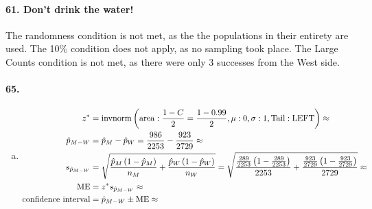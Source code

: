 		\paragraph{61. Don't drink the water!}
			The randomness condition is not met, as the the populations in their entirety are used.
			The 10\% condition does not apply, as no sampling took place.
			The Large Counts condition is not met, as there were only 3 successes from the West side.
			\paragraph{65. }
				\begin{enumerate}[a.] 
					\item
						\begin{align*}
							z^* &= \operatorname{invnorm}\left(\operatorname{area}:\frac{1 - C}{2} = \frac{1 - 0.99}{2}, \mu: 0, \sigma: 1, \mathrm{Tail: LEFT}\right) \approx \\
							\hat{p}_{M - W} &= \hat{p}_M - \hat{p}_W = \frac{986}{2253} - \frac{923}{2729} \approx \\ s_{\hat{p}_{M - W}} &= \sqrt{\frac{\hat{p}_M\left(1 - \hat{p}_M\right)}{n_M} + \frac{\hat{p}_W\left(1 - \hat{p}_W\right)}{n_W}} = \sqrt{\frac{\frac{289}{2253}\left(1 - \frac{289}{2253}\right)}{2253} + \frac{\frac{923}{2729}\left(1 - \frac{923}{2729}\right)}{2729}} \approx \\
							\operatorname{ME} &= z^*s_{\hat{p}_{M - W}} \approx \\
							\text{confidence interval} &= \hat{p}_{M - W} \pm \operatorname{ME} \approx 
						\end{align*}
				\end{enumerate}
